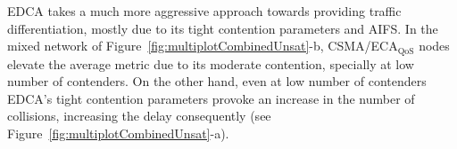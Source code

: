 EDCA takes a much more aggressive approach towards providing traffic differentiation, mostly due to its tight contention parameters and AIFS. In the mixed network of Figure~\ref{fig:multiplotCombinedUnsat}-b, CSMA/ECA$_{\text{QoS}}$ nodes elevate the average metric due to its moderate contention, specially at low number of contenders. On the other hand, even at low number of contenders EDCA's tight contention parameters provoke an increase in the number of collisions, increasing the delay consequently (see Figure~\ref{fig:multiplotCombinedUnsat}-a).



%
%	
	
